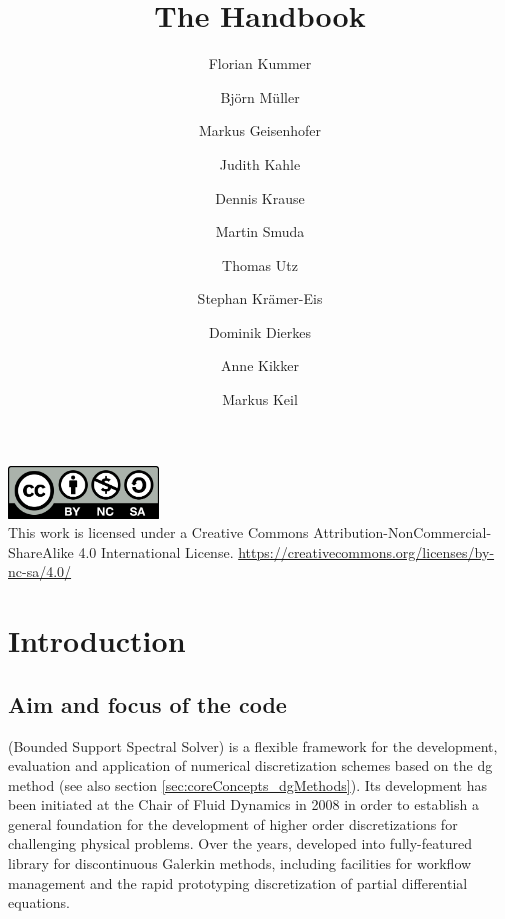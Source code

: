 \documentclass[a4paper,10pt]{report} %
\title{The \BoSSS{} Handbook}
\author{
Florian Kummer \and
Björn Müller \and
Markus Geisenhofer \and
Judith Kahle \and %
Dennis Krause \and
Martin Smuda \and
Thomas Utz  \and
Stephan Krämer-Eis \and
Dominik Dierkes \and
Anne Kikker \and
Markus Keil %
}
\begin{document}
\maketitle
\clearpage
\vfill


\includegraphics[width=4cm]{by-nc-sa}\\

This work is licensed under a Creative Commons Attribution-NonCommercial-ShareAlike 4.0 International License. 
\url{https://creativecommons.org/licenses/by-nc-sa/4.0/}

\clearpage

\tableofcontents


\part{Introduction}
\label{sec:introduction}


\chapter{Aim and focus of the \BoSSS{} code}

\BoSSS{} (Bounded Support Spectral Solver) is a flexible framework for the 
development, evaluation and application of numerical discretization schemes based on the 
\ac{dg}  method (see also section \ref{sec:coreConcepts_dgMethods}). 
Its development has been initiated at the Chair of Fluid Dynamics in 2008 in
order to establish a general foundation for the development of higher order discretizations for 
challenging physical problems.
Over the years,
\BoSSS{} developed into fully-featured library for discontinuous Galerkin methods, including facilities for
workflow management and the rapid prototyping discretization of partial differential equations.
\end{document}
